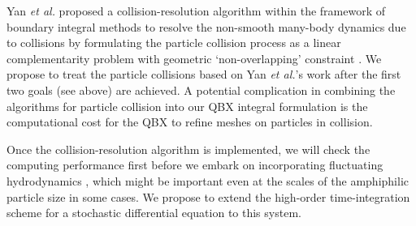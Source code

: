 Yan {\it et al.} proposed
a collision-resolution algorithm within the framework of boundary integral methods to resolve the non-smooth many-body
dynamics due to collisions by formulating the particle collision process as a linear complementarity problem with geometric 
`non-overlapping' constraint \cite{Yan2019}. 
We propose to treat the particle collisions based on Yan {\it et al.}'s work after the first two goals (see above)
are achieved. 
A potential complication in combining the algorithms for particle collision into our 
QBX integral formulation is the computational cost for the QBX to refine meshes on particles in collision.

Once the collision-resolution algorithm is implemented, we will check the computing performance first before we embark on 
incorporating fluctuating hydrodynamics \cite{Bao17,Bao18}, which might be important even at the scales of the amphiphilic 
particle size in some cases. We propose to extend the high-order
time-integration scheme for a stochastic differential equation
\cite{fu2015pre} to
this system.

